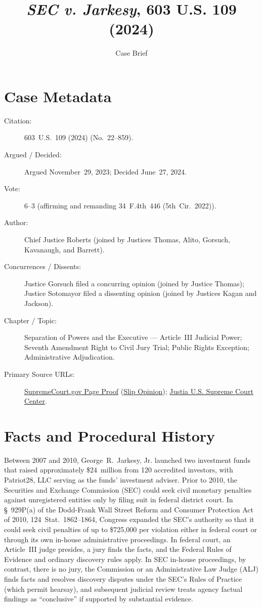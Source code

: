 \documentclass[12pt]{article}
\title{\textit{SEC v. Jarkesy}, 603 U.S. 109 (2024)}
\author{Case Brief}
\date{}
\begin{document}
\maketitle

\section{Case Metadata}
\begin{description}
  \item[Citation:] 603~U.S.~109 (2024) (No.~22--859).
  \item[Argued / Decided:] Argued November~29, 2023; Decided June~27, 2024.
  \item[Vote:] 6--3 (affirming and remanding 34~F.4th~446 (5th~Cir.~2022)).
  \item[Author:] Chief Justice Roberts (joined by Justices Thomas, Alito, Gorsuch, Kavanaugh, and Barrett).
  \item[Concurrences / Dissents:] Justice Gorsuch filed a concurring opinion (joined by Justice Thomas); Justice Sotomayor filed a dissenting opinion (joined by Justices Kagan and Jackson).
  \item[Chapter / Topic:] Separation of Powers and the Executive --- Article~III Judicial Power; Seventh Amendment Right to Civil Jury Trial; Public Rights Exception; Administrative Adjudication.
  \item[Primary Source URLs:] \href{https://www.supremecourt.gov/opinions/23pdf/603us1r50_7kh7.pdf}{SupremeCourt.gov Page Proof} (\href{https://www.supremecourt.gov/opinions/23pdf/22-859_1924.pdf}{Slip Opinion}); \href{https://supreme.justia.com/cases/federal/us/603/22-859/}{Justia U.S. Supreme Court Center}.
\end{description}

\section{Facts and Procedural History}
Between 2007 and 2010, George~R.~Jarkesy, Jr. launched two investment funds that raised approximately \$24~million from 120 accredited investors, with Patriot28, LLC serving as the funds' investment adviser. Prior to 2010, the Securities and Exchange Commission (SEC) could seek civil monetary penalties against unregistered entities only by filing suit in federal district court. In \S~929P(a) of the Dodd-Frank Wall Street Reform and Consumer Protection Act of 2010, 124~Stat.~1862--1864, Congress expanded the SEC's authority so that it could seek civil penalties of up to \$725,000 per violation either in federal court or through its own in-house administrative proceedings. In federal court, an Article~III judge presides, a jury finds the facts, and the Federal Rules of Evidence and ordinary discovery rules apply. In SEC in-house proceedings, by contrast, there is no jury, the Commission or an Administrative Law Judge (ALJ) finds facts and resolves discovery disputes under the SEC's Rules of Practice (which permit hearsay), and subsequent judicial review treats agency factual findings as ``conclusive'' if supported by substantial evidence.
\end{document}
